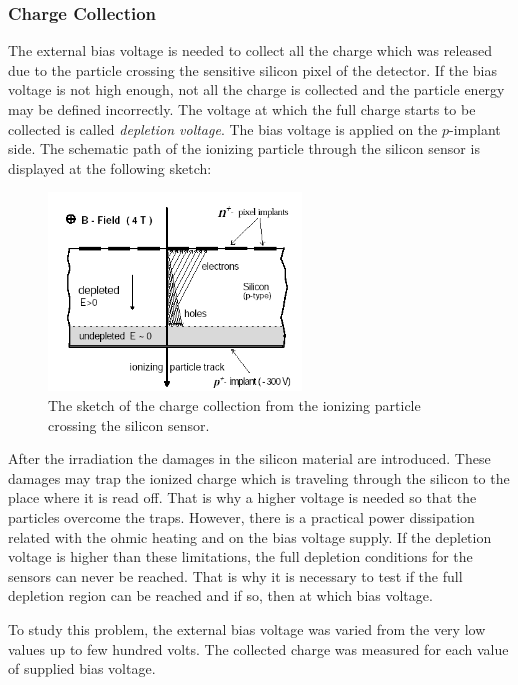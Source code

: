 \subsubsection{Charge Collection}

The external bias voltage is needed to collect all the charge which was released due to the particle crossing the sensitive silicon
pixel of the detector. If the bias voltage is not high enough, not all the charge is collected and the particle energy may be defined
incorrectly. The voltage at which the full charge starts to be collected is called \textit{depletion voltage}. The bias voltage is
applied on the $p$-implant side. The schematic path of the ionizing particle through the silicon sensor is displayed at the following sketch:

\begin{figure}[h]
 \centering
 \includegraphics[width=0.6\textwidth]{021_pixel_upgrade/plots/depletion_voltage.png}
 \caption{The sketch of the charge collection from the ionizing particle crossing the silicon sensor.}
 \label{fig:depl_volt}
\end{figure}

After the irradiation the damages in the silicon material are introduced. These damages may trap the ionized charge  which is traveling 
through the silicon to the place where it is read off. That is why a higher voltage is needed so that the particles overcome the traps.
However, there is a practical power dissipation related with the ohmic heating and on the bias voltage supply. If the depletion voltage
is higher than these limitations, the full depletion conditions for the sensors can never be reached. That is why it is necessary to test
if the full depletion region can be reached and if so, then at which bias voltage.

To study this problem, the external bias voltage was varied from the very low values up to few hundred volts. The collected charge was
measured for each value of supplied bias voltage.

